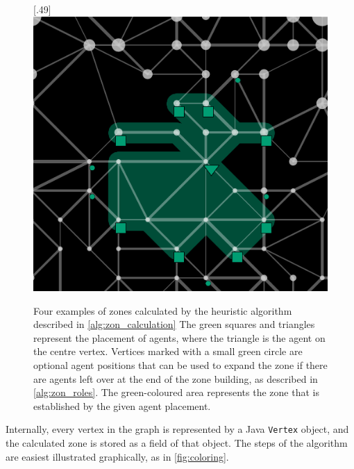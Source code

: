 \begin{figure}
  [.49\linewidth]{\includegraphics[width=.49\linewidth]{images/zone4.png}}
           \caption{Four examples of zones calculated by the heuristic algorithm described in \autoref{alg:zon_calculation}
           The green squares and triangles represent the placement of agents, where the triangle is the agent on the centre vertex.
           Vertices marked with a small green circle are optional agent positions that can be used to expand the zone if there are agents left over at the end of the zone building, as described in \autoref{alg:zon_roles}.
           The green-coloured area represents the zone that is established by the given agent placement.}
  \label{fig:zones}
\end{figure}
Internally, every vertex in the graph is represented by a Java \lstinline{Vertex} object, and the calculated zone is stored as a field of that object.
The steps of the algorithm are easiest illustrated graphically, as in \autoref{fig:coloring}.
